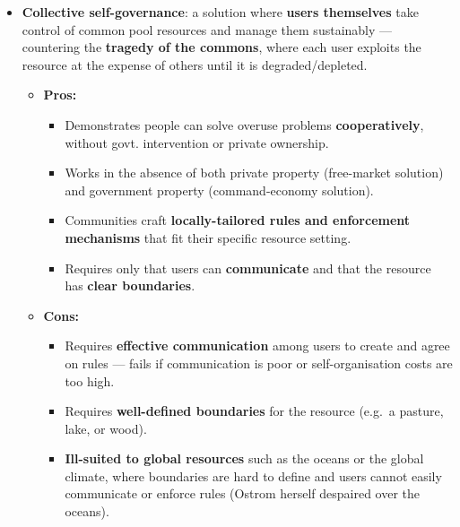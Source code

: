 \documentclass[a4paper,12pt]{article}
\begin{document}
\begin{itemize}
\begin{itemize}
\begin{itemize}
      \item \textbf{Cannot distinguish between firms} with low vs.\ high pollution-reduction costs $\to$ pollution is reduced at a \textit{higher overall cost} than market-based policies.
      \item \textbf{Same technical limitations} as market-based policies (lack of information on pollutant types and quantities) $\to$ only \textit{partially effective}.
      \item \textbf{Costly monitoring and supervision} to detect violations; OPC and enforcement problems.
      \item Effectiveness varies with the situation --- more effective in some contexts than others.
    \end{itemize}
  \end{itemize}
  \item \textbf{Collective self-governance}: a solution where \textbf{users themselves} take control of common pool resources and manage them sustainably --- countering the \textbf{tragedy of the commons}, where each user exploits the resource at the expense of others until it is degraded/depleted.
  \begin{itemize}
    \item \textbf{Pros:}
    \begin{itemize}
      \item Demonstrates people can solve overuse problems \textbf{cooperatively}, without govt. intervention or private ownership.
      \item Works in the absence of both private property (free-market solution) and government property (command-economy solution).
      \item Communities craft \textbf{locally-tailored rules and enforcement mechanisms} that fit their specific resource setting.
      \item Requires only that users can \textbf{communicate} and that the resource has \textbf{clear boundaries}.
    \end{itemize}
    \item \textbf{Cons:}
    \begin{itemize}
      \item Requires \textbf{effective communication} among users to create and agree on rules --- fails if communication is poor or self-organisation costs are too high.
      \item Requires \textbf{well-defined boundaries} for the resource (e.g.\ a pasture, lake, or wood).
      \item \textbf{Ill-suited to global resources} such as the oceans or the global climate, where boundaries are hard to define and users cannot easily communicate or enforce rules (Ostrom herself despaired over the oceans).

\end{itemize}
\end{itemize}
\end{itemize}
\end{document}
